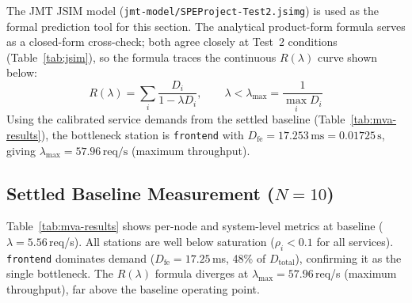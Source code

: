 \documentclass[12pt]{article}
\begin{document}
The JMT JSIM model (\texttt{jmt-model/SPEProject-Test2.jsimg}) is used as the formal prediction tool for this section. The analytical product-form formula serves as a closed-form cross-check; both agree closely at Test~2 conditions (Table~\ref{tab:jsim}), so the formula traces the continuous $R(\lambda)$ curve shown below:
\[
  R(\lambda) = \sum_{i} \frac{D_i}{1 - \lambda D_i}, \qquad \lambda < \lambda_{\max} = \frac{1}{\max_i D_i}
\]
Using the calibrated service demands from the settled baseline (Table~\ref{tab:mva-results}), the bottleneck station is \texttt{frontend} with $D_{\text{fe}} = 17.253\,\text{ms} = 0.01725\,\text{s}$, giving $\lambda_{\max} = 57.96\,\text{req/s}$ (maximum throughput).

\subsection{Settled Baseline Measurement ($N=10$)}

Table~\ref{tab:mva-results} shows per-node and system-level metrics at baseline ($\lambda=5.56$\,req/s). All stations are well below saturation ($\rho_i < 0.1$ for all services). \texttt{frontend} dominates demand ($D_{\text{fe}}=17.25$\,ms, 48\% of $D_{\text{total}}$), confirming it as the single bottleneck. The $R(\lambda)$ formula diverges at $\lambda_{\max}=57.96$\,req/s (maximum throughput), far above the baseline operating point.
\end{document}
